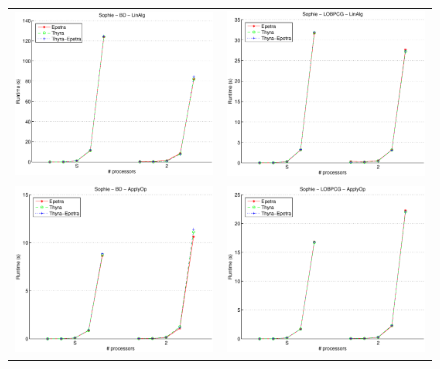 \documentclass[10pt]{article}
\begin{document}
\begin{figure}[htp]
\begin{tabular}{cc}
\includegraphics[width=2.50in]{results/sophie/Sophie-BD-LinAlg_ln.eps} &
\includegraphics[width=2.50in]{results/sophie/Sophie-LOBPCG-LinAlg_ln.eps} \\
\includegraphics[width=2.50in]{results/sophie/Sophie-BD-ApplyOp_ln.eps} &
\includegraphics[width=2.50in]{results/sophie/Sophie-LOBPCG-ApplyOp_ln.eps} \\

\end{tabular}
\end{figure}
\end{document}
